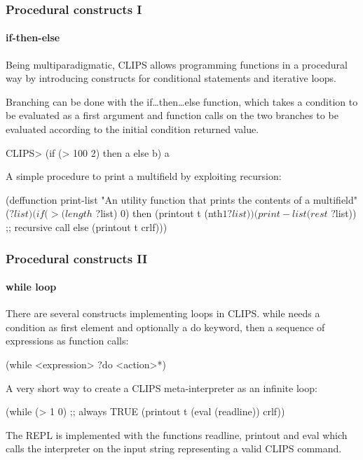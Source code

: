 \documentclass[xcolor={usenames,dvipsnames,svgnames}, compress]{beamer}
\begin{document}
\begin{frame}[fragile]
  \frametitle{Procedural constructs I}
  \framesubtitle{if-then-else}
  
  Being multiparadigmatic, CLIPS allows programming functions in a
  procedural way by introducing constructs for conditional statements
  and iterative loops.\par\bigskip
  
  Branching can be done with the \textsf{if\dots then\dots else}
  function, which takes a condition to be evaluated as a first
  argument and function calls on the two branches to be evaluated
  according to the initial condition returned value.
  \begin{clips-code}
    CLIPS> (if (> 100 2) then a else b)
    a
  \end{clips-code}


  A simple procedure to print a multifield by exploiting recursion:
  \begin{clips-code}[numbers=none]
    (deffunction print-list
        "An utility function that prints the contents of a multifield"
        ($?list)
        (if (> (length$ ?list) 0)
            then (printout t (nth$ 1 ?list))
                 (print-list (rest$ ?list)) ;; recursive call
            else (printout t crlf)))
          \end{clips-code}

  
          
\end{frame}

\begin{frame}[fragile]
  \frametitle{Procedural constructs II}
  \framesubtitle{while loop}
  There are several constructs implementing loops in
  CLIPS. \textsf{while} needs a condition as first element and
  optionally a \textsf{do} keyword, then a sequence of expressions
  as function calls:
  \begin{clips-code}[numbers=none]
    (while <expression> ?do
           <action>*)
  \end{clips-code}\bigskip

         

  A very short way to create a CLIPS meta-interpreter as an infinite loop:
  \begin{clips-code}[numbers=none]
    (while (> 1 0) ;; always TRUE
        (printout t (eval (readline)) crlf))
  \end{clips-code}
  The REPL is implemented with the functions \textsf{readline},
  \textsf{printout} and \textsf{eval} which calls the interpreter on
  the input string representing a valid CLIPS command.
      
\end{frame}
\end{document}

